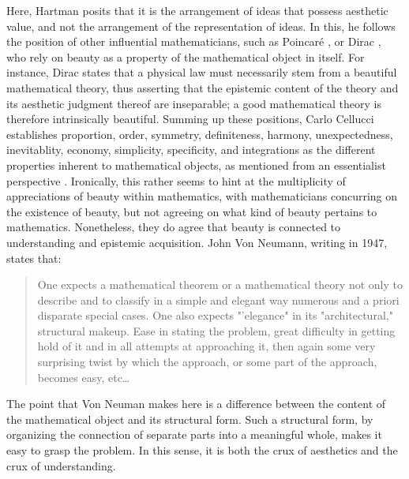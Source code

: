 Here, Hartman posits that it is the arrangement of ideas that possess aesthetic value, and not the arrangement of the representation of ideas. In this, he follows the position of other influential mathematicians, such as Poincaré \citep{poincare_science_1908}, or Dirac \citep{kragh_paul_2002}, who rely on beauty as a property of the mathematical object in itself. For instance, Dirac states that a physical law must necessarily stem from a beautiful mathematical theory, thus asserting that the epistemic content of the theory and its aesthetic judgment thereof are inseparable; a good mathematical theory is therefore intrinsically beautiful. Summing up these positions, Carlo Cellucci establishes proportion, order, symmetry, definiteness, harmony, unexpectedness, inevitablity, economy, simplicity, specificity,  and integrations as the different properties inherent to mathematical objects, as mentioned from an essentialist perspective \citep{cellucci_mathematical_2015}. Ironically, this rather seems to hint at the multiplicity of appreciations of beauty within mathematics, with mathematicians concurring on the existence of beauty, but not agreeing on what kind of beauty pertains to mathematics. Nonetheless, they do agree that beauty is connected to understanding and epistemic acquisition. John Von Neumann, writing in 1947, states that:

\begin{quote}
    One expects a mathematical theorem or a mathematical theory not only to describe and to classify in a simple and elegant way numerous and a priori disparate special cases. One also expects "'elegance" in its "architectural," structural makeup. Ease in stating the problem, great difficulty in getting hold of it and in all attempts at approaching it, then again some very surprising twist by which the approach, or some part of the approach, becomes easy, etc\dots \citep{vonneumann_mathematician_1947}
\end{quote}

The point that Von Neuman makes here is a difference between the content of the mathematical object and its structural form. Such a structural form, by organizing the connection of separate parts into a meaningful whole, makes it easy to grasp the problem. In this sense, it is both the crux of aesthetics and the crux of understanding.

